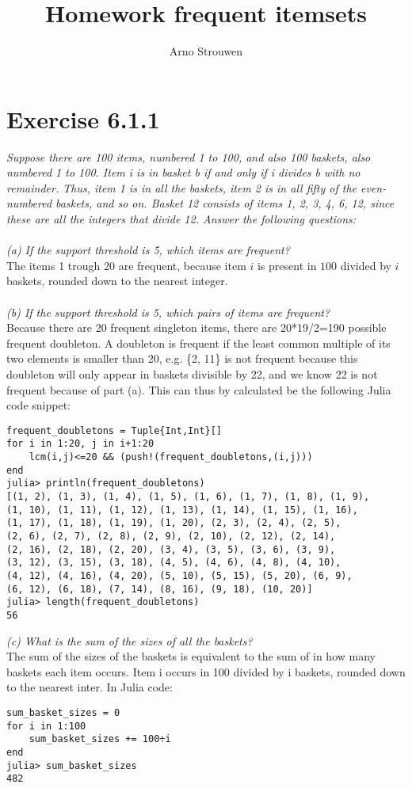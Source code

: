 \documentclass{article}
\begin{document}
	\title{Homework frequent itemsets}
	\author{Arno Strouwen}
	\maketitle
\section*{Exercise 6.1.1}
\textit{Suppose there are 100 items, numbered 1 to 100, and also 100
baskets, also numbered 1 to 100. Item i is in basket b if and only if i divides b
with no remainder. Thus, item 1 is in all the baskets, item 2 is in all fifty of the
even-numbered baskets, and so on. Basket 12 consists of items {1, 2, 3, 4, 6, 12},
since these are all the integers that divide 12. Answer the following questions:}
\\
\\
\textit{(a) If the support threshold is 5, which items are frequent?}
\\
The items 1 trough 20 are frequent, because item $i$ is present in $100$ divided by $i$ baskets,
rounded down to the nearest integer.
\\
\\
\textit{(b) If the support threshold is 5, which pairs of items are frequent?}
\\
Because there are 20 frequent singleton items, there are 20*19/2=190 possible frequent doubleton.
A doubleton is frequent if the least common multiple of its two elements is smaller than 20,
e.g. \{2, 11\} is not frequent because this doubleton will only appear in baskets divisible by 22,
and we know 22 is not frequent because of part (a).
This can thus by calculated be the following Julia code snippet:
\begin{verbatim}
frequent_doubletons = Tuple{Int,Int}[]
for i in 1:20, j in i+1:20
    lcm(i,j)<=20 && (push!(frequent_doubletons,(i,j)))
end
julia> println(frequent_doubletons)
[(1, 2), (1, 3), (1, 4), (1, 5), (1, 6), (1, 7), (1, 8), (1, 9),
(1, 10), (1, 11), (1, 12), (1, 13), (1, 14), (1, 15), (1, 16),
(1, 17), (1, 18), (1, 19), (1, 20), (2, 3), (2, 4), (2, 5),
(2, 6), (2, 7), (2, 8), (2, 9), (2, 10), (2, 12), (2, 14),
(2, 16), (2, 18), (2, 20), (3, 4), (3, 5), (3, 6), (3, 9),
(3, 12), (3, 15), (3, 18), (4, 5), (4, 6), (4, 8), (4, 10),
(4, 12), (4, 16), (4, 20), (5, 10), (5, 15), (5, 20), (6, 9),
(6, 12), (6, 18), (7, 14), (8, 16), (9, 18), (10, 20)]
julia> length(frequent_doubletons)
56
\end{verbatim}
\textit{(c) What is the sum of the sizes of all the baskets?}
\\
The sum of the sizes of the baskets is equivalent to the sum of in how many baskets each item occurs.
Item i occurs in 100 divided by i baskets, rounded down to the nearest inter. In Julia code:
\begin{verbatim}
sum_basket_sizes = 0
for i in 1:100
    sum_basket_sizes += 100÷i
end
julia> sum_basket_sizes
482
\end{verbatim}
\end{document}

